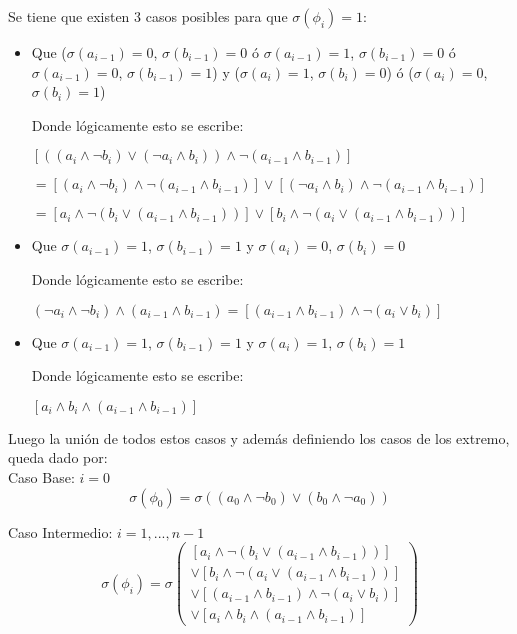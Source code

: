 \documentclass[
	spanish, %
	letterpaper, oneside
]{article}
\begin{document}
Se tiene que existen 3 casos posibles para que $\sigma(\phi_i) = 1$:
\begin{itemize}
    \item Que ($\sigma(a_{i-1}) = 0$, $\sigma(b_{i-1}) = 0$ ó $\sigma(a_{i-1}) = 1$, $\sigma(b_{i-1}) = 0$ ó $\sigma(a_{i-1}) = 0$, $\sigma(b_{i-1}) = 1$) y ($\sigma(a_{i}) = 1$, $\sigma(b_{i}) = 0$) ó ($\sigma(a_{i}) = 0$, $\sigma(b_{i}) = 1$)
    
    Donde lógicamente esto se escribe:
    
    $[((a_i \land \neg b_i) \vee (\neg a_i \land b_i)) \land \neg(a_{i-1} \land b_{i-1})]$ 

    $= [(a_i \land \neg b_i) \land \neg(a_{i-1} \land b_{i-1})] \vee [(\neg a_i \land b_i) \land \neg(a_{i-1} \land b_{i-1})]$
    
    $= [a_i \wedge \neg (b_i \vee (a_{i-1} \wedge b_{i-1}))] \vee [b_i \wedge \neg (a_i\vee (a_{i-1} \wedge b_{i-1}) )]$
    
    \item Que $\sigma(a_{i-1}) = 1$, $\sigma(b_{i-1}) = 1$ y $\sigma(a_{i}) = 0$, $\sigma(b_{i}) = 0$

    Donde lógicamente esto se escribe:

    $(\neg a_i \land \neg b_i) \land (a_{i-1} \land b_{i-1}) = [(a_{i-1}\wedge b_{i-1})\wedge \neg(a_i \vee b_i)]$

    \item Que $\sigma(a_{i-1}) = 1$, $\sigma(b_{i-1}) = 1$ y $\sigma(a_{i}) = 1$, $\sigma(b_{i}) = 1$

    Donde lógicamente esto se escribe:

    $[a_i \wedge b_i \wedge (a_{i-1}\wedge b_{i-1})]$
\end{itemize}

Luego la unión de todos estos casos y además definiendo los casos de los extremo, queda dado por:\\

Caso Base: $i = 0$
\begin{equation}
    \sigma(\phi_0) = 
    \sigma((a_0 \wedge \neg b_0) \vee (b_0 \wedge \neg a_0))
\end{equation}

Caso Intermedio:  $i={1,...,n-1}$
\begin{equation}
    \sigma(\phi_i) = \sigma
    \begin{pmatrix}
        [a_i \wedge \neg (b_i \vee (a_{i-1} \wedge b_{i-1}))] \\
        \vee [b_i \wedge \neg (a_i\vee (a_{i-1} \wedge b_{i-1}) )] \\
        \vee [(a_{i-1}\wedge b_{i-1})\wedge \neg(a_i \vee b_i)] \\
        \vee [a_i \wedge b_i \wedge (a_{i-1}\wedge b_{i-1})]
    \end{pmatrix}
\end{equation}
\end{document}
